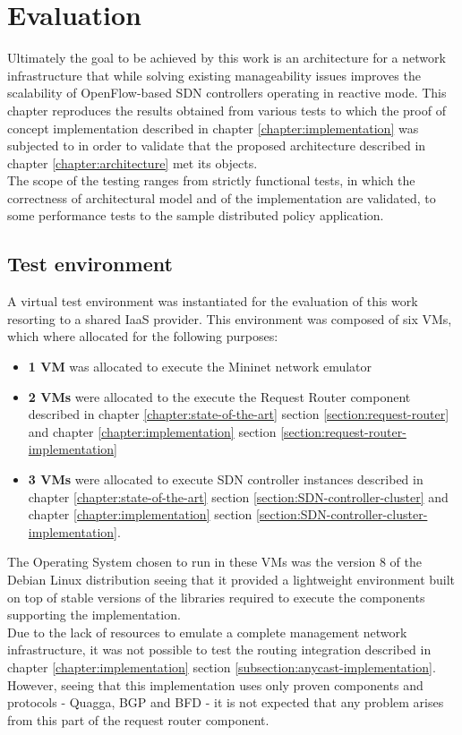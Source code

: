 
\chapter{Evaluation}
\label{chapter:evaluation}
Ultimately the goal to be achieved by this work is an architecture for a network infrastructure that while solving existing manageability issues improves the scalability of OpenFlow-based \gls{SDN} controllers operating in reactive mode.
This chapter reproduces the results obtained from various tests to which the proof of concept implementation described in chapter \ref{chapter:implementation} was subjected to in order to validate that the proposed architecture described in chapter \ref{chapter:architecture} met its objects.\\
The scope of the testing ranges from strictly functional tests, in which the correctness of architectural model and of the implementation are validated, to some performance tests to the sample distributed policy application.
%
\section{Test environment}
\label{section:test-environment}
A virtual test environment was instantiated for the evaluation of this work resorting to a shared \gls{IaaS} provider.
This environment was composed of six \glspl{VM}, which where allocated for the following purposes:
\begin{itemize}
	\item \textbf{1 \gls{VM}} was allocated to execute the Mininet network emulator
	\item \textbf{2 \glspl{VM}} were allocated to the execute the Request Router component described in chapter \ref*{chapter:state-of-the-art} section \ref{section:request-router} and chapter \ref*{chapter:implementation} section \ref{section:request-router-implementation}
	\item \textbf{3 \glspl{VM}} were allocated to execute \gls{SDN} controller instances described in chapter \ref*{chapter:state-of-the-art} section \ref{section:SDN-controller-cluster} and chapter \ref*{chapter:implementation} section \ref{section:SDN-controller-cluster-implementation}.
\end{itemize}
%
The Operating System chosen to run in these \glspl{VM} was the version 8 of the Debian Linux distribution seeing that it provided a lightweight environment built on top of stable versions of the libraries required to execute the components supporting the implementation.\\
Due to the lack of resources to emulate a complete management network infrastructure, it was not possible to test the routing integration described in chapter \ref*{chapter:implementation} section \ref{subsection:anycast-implementation}.
However, seeing that this implementation uses only proven components and protocols - Quagga, \gls{BGP} and \gls{BFD} - it is not expected that any problem arises from this part of the request router component.
%
